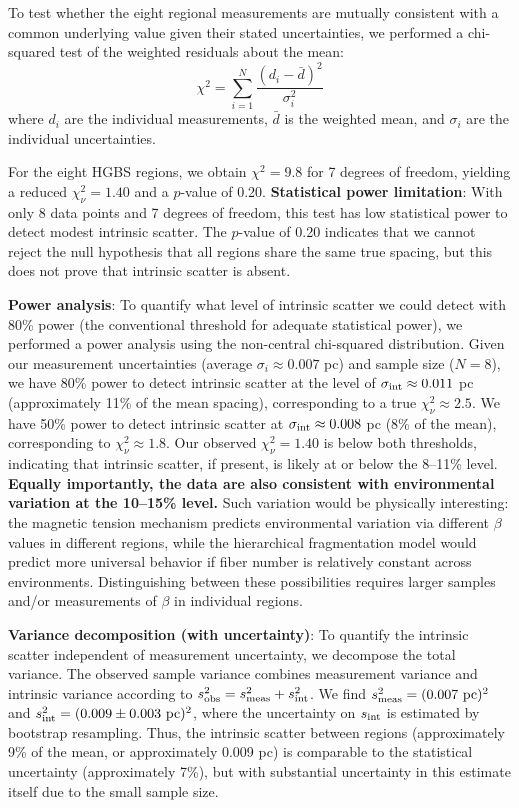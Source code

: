 \documentclass[11pt,a4paper]{article}
\begin{document}
To test whether the eight regional measurements are mutually consistent with a common underlying value given their stated uncertainties, we performed a chi-squared test of the weighted residuals about the mean:
\begin{equation}
\chi^2 = \sum_{i=1}^{N} \frac{(d_i - \bar{d})^2}{\sigma_i^2}
\end{equation}
where $d_i$ are the individual measurements, $\bar{d}$ is the weighted mean, and $\sigma_i$ are the individual uncertainties.

For the eight HGBS regions, we obtain $\chi^2 = 9.8$ for 7 degrees of freedom, yielding a reduced $\chi^2_{\nu} = 1.40$ and a $p$-value of 0.20. \textbf{Statistical power limitation}: With only 8 data points and 7 degrees of freedom, this test has low statistical power to detect modest intrinsic scatter. The $p$-value of 0.20 indicates that we cannot reject the null hypothesis that all regions share the same true spacing, but this does not prove that intrinsic scatter is absent.

\textbf{Power analysis}: To quantify what level of intrinsic scatter we could detect with 80\% power (the conventional threshold for adequate statistical power), we performed a power analysis using the non-central chi-squared distribution. Given our measurement uncertainties (average $\sigma_i \approx 0.007$ pc) and sample size ($N = 8$), we have 80\% power to detect intrinsic scatter at the level of $\sigma_{\rm int} \approx 0.011$ pc (approximately 11\% of the mean spacing), corresponding to a true $\chi^2_{\nu} \approx 2.5$. We have 50\% power to detect intrinsic scatter at $\sigma_{\rm int} \approx 0.008$ pc (8\% of the mean), corresponding to $\chi^2_{\nu} \approx 1.8$. Our observed $\chi^2_{\nu} = 1.40$ is below both thresholds, indicating that intrinsic scatter, if present, is likely at or below the 8--11\% level. \textbf{Equally importantly, the data are also consistent with environmental variation at the 10--15\% level.} Such variation would be physically interesting: the magnetic tension mechanism predicts environmental variation via different $\beta$ values in different regions, while the hierarchical fragmentation model would predict more universal behavior if fiber number is relatively constant across environments. Distinguishing between these possibilities requires larger samples and/or measurements of $\beta$ in individual regions.

\textbf{Variance decomposition (with uncertainty)}: To quantify the intrinsic scatter independent of measurement uncertainty, we decompose the total variance. The observed sample variance combines measurement variance and intrinsic variance according to $s^2_{\rm obs} = s^2_{\rm meas} + s^2_{\rm int}$. We find $s^2_{\rm meas} = (0.007~{\rm pc})^2$ and $s^2_{\rm int} = (0.009 \pm 0.003~{\rm pc})^2$, where the uncertainty on $s_{\rm int}$ is estimated by bootstrap resampling. Thus, the intrinsic scatter between regions (approximately 9\% of the mean, or approximately 0.009 pc) is comparable to the statistical uncertainty (approximately 7\%), but with substantial uncertainty in this estimate itself due to the small sample size.
\end{document}
